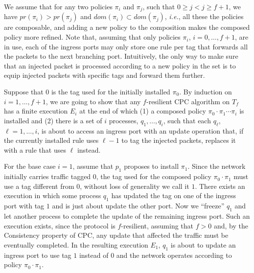 \documentclass[11pt,pdftex,letter]{article}
\newcommand{\dom}{\textit{dom}}
\newcommand{\pr}{\textit{pr}}
\newcommand{\ie}{{\it i.e.}}
\begin{document}
\begin{appendix}

We assume that for any two policies $\pi_i$ and $\pi_{j}$, such that
$0\geq j<j \geq f+1$, we have $\pr(\pi_{i})>\pr(\pi_{j})$
and $\dom(\pi_{i})\subset\dom(\pi_{j})$, \ie, all these the
policies  are composable, and  adding a new policy to the
composition makes the composed policy more refined.
Note that, assuming that only policies $\pi_i$, $i=0,\ldots,f+1$,
are in use, each of the ingress ports may only store one rule per tag that
forwards all the packets to the next branching port.
Intuitively, the only way to make sure that an injected packet is processed
according to a new policy in the set is to equip injected packets with
specific tags and forward them further.

Suppose that $0$ is the tag used for the initially installed $\pi_0$.
By induction on $i=1,\ldots,f+1$, we are going to show that any $f$-resilient CPC algorithm
on $T_f$ has a finite execution $E_i$
 at the end of which
(1) a composed policy $\pi_0\cdot\pi_1\cdots\pi_{i}$ is installed
and (2) there is a set of $i$ processes, $q_1,\ldots,q_{i}$, such that
each $q_{\ell}$, $\ell=1,\ldots,i$, is about to access
an ingress port with an update operation that, if the currently installed
rule uses $\ell-1$ to tag the injected packets, replaces it with a
rule that uses $\ell$ instead.

For the base case $i=1$, assume that $p_1$ proposes to install
$\pi_1$. Since the network initially carries traffic tagged $0$, the
tag used for the composed policy $\pi_0\cdot\pi_1$ must use a tag
different from $0$, without loss of generality we call it $1$.
There exists an execution in which
some process $q_1$ has updated the tag on one of the ingress port with
tag $1$ and is just about update the other port.
Now we ``freeze'' $q_1$ and let another process to complete the update
of the remaining ingress port.
Such an execution exists, since the protocol is $f$-resilient,
assuming that $f>0$ and, by the Consistency property of CPC,  any update that
affected the traffic must be eventually completed.
In the resulting execution $E_1$, $q_1$ is about to update
an ingress port to use tag $1$ instead of $0$ and the network operates
according to policy $\pi_0\cdot\pi_1$.


\end{appendix}
\end{document}
